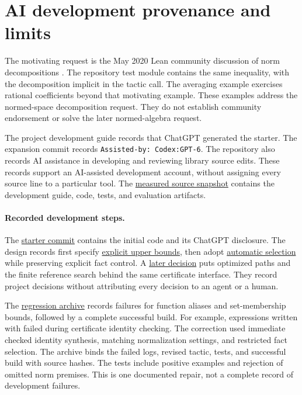 \section{AI development provenance and limits}\label{app:development}
The motivating request is the May 2020 Lean community discussion of norm decompositions \citep{leanrequest2020}.
The repository test module contains the same inequality, with the decomposition implicit in the tactic call.
The averaging example exercises rational coefficients beyond that motivating example.
These examples address the normed-space decomposition request.
They do not establish community endorsement or solve the later normed-algebra request.

The project development guide records that ChatGPT generated the starter.
The expansion commit records \texttt{Assisted-by: Codex:GPT-6}.
The repository also records AI assistance in developing and reviewing library source edits.
These records support an AI-assisted development account, without assigning every source line to a particular tool.
The \href{https://github.com/TomasOrtega/norm-arith/tree/0f9b637e6f3f385e8ffa7c8a6135beb0e9c6fdc2}{measured source snapshot} contains the development guide, code, tests, and evaluation artifacts.

\paragraph{Recorded development steps.}
The \href{https://github.com/TomasOrtega/norm-arith/commit/e5b88e1}{starter commit} contains the initial code and its ChatGPT disclosure.
The design records first specify \href{https://github.com/TomasOrtega/norm-arith/blob/0f9b637e6f3f385e8ffa7c8a6135beb0e9c6fdc2/docs/adr/0002-initial-tactic-fragment.md}{explicit upper bounds}, then adopt \href{https://github.com/TomasOrtega/norm-arith/blob/0f9b637e6f3f385e8ffa7c8a6135beb0e9c6fdc2/docs/adr/0004-automatic-bound-discovery.md}{automatic selection} while preserving explicit fact control.
A \href{https://github.com/TomasOrtega/norm-arith/blob/0f9b637e6f3f385e8ffa7c8a6135beb0e9c6fdc2/docs/adr/0008-normalized-core-and-shared-certificates.md}{later decision} puts optimized paths and the finite reference search behind the same certificate interface.
They record project decisions without attributing every decision to an agent or a human.

The \href{https://github.com/TomasOrtega/norm-arith/tree/0f9b637e6f3f385e8ffa7c8a6135beb0e9c6fdc2/artifacts/expansion/next/production-regressions}{regression archive} records failures for function aliases and set-membership bounds, followed by a complete successful build.
For example, expressions written with  failed during certificate identity checking.
The correction used immediate checked identity synthesis, matching normalization settings, and restricted fact selection.
The archive binds the failed logs, revised tactic, tests, and successful build with source hashes.
The tests include positive examples and rejection of omitted norm premises.
This is one documented repair, not a complete record of development failures.

